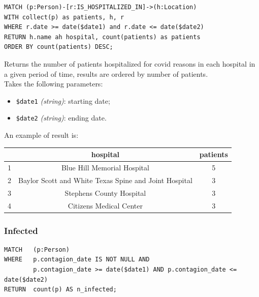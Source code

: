 \documentclass[12pt, a4paper]{article}
\begin{document}
\begin{tcolorbox}[fontupper=\scriptsize]
    \begin{verbatim}
MATCH (p:Person)-[r:IS_HOSPITALIZED_IN]->(h:Location)
WITH collect(p) as patients, h, r
WHERE r.date >= date($date1) and r.date <= date($date2)
RETURN h.name ah hospital, count(patients) as patients
ORDER BY count(patients) DESC;
    \end{verbatim}
\end{tcolorbox}

\noindent %
Returns the number of patients hospitalized for covid reasons in each 
hospital in a given period of time, results are ordered by number of 
patients. \\
Takes the following parameters: 

\begin{itemize}
    \item \texttt{\$date1} \emph{(string)}: starting date;
    \item \texttt{\$date2} \emph{(string)}: ending date.
\end{itemize}

\noindent %
An example of result is: 
\begin{center}
    \begin{tabular}{ |c|c|c|} 
        \hline 
        & hospital & patients\\ 
        \hline
        1 & Blue Hill Memorial Hospital & 5 \\
        2 & Baylor Scott and White Texas Spine and Joint Hospital & 3\\
        3 & Stephens County Hospital & 3\\
        4 & Citizens Medical Center & 3\\
        \hline
    \end{tabular}
\end{center}

\subsubsection{Infected}
\begin{tcolorbox}[fontupper=\scriptsize]
    \begin{verbatim}
MATCH   (p:Person)
WHERE   p.contagion_date IS NOT NULL AND
        p.contagion_date >= date($date1) AND p.contagion_date <= date($date2)
RETURN  count(p) AS n_infected;
    \end{verbatim}
\end{tcolorbox}
\end{document}
